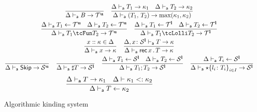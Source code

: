 \begin{figure}[h!]
  \centering
  \hfill{}
  \begin{gather*}
    \frac{}{\algkindout{\tcBase}{\kindt^\Un}}
    \quad 
    \frac{
      \algkindout{T_1}{\kind_1}
      \quad
      \algkindout{T_2}{\kind_2}
    }{
      \algkindout{\tPair{T_1}{T_2}}{\max(\kind_1, \kind_2)}
    }
    \\
    \frac{
      \algkindin{T_1}{\kindt^\Un}
      \quad
      \algkindin{T_2}{\kindt^\Un}
    }{
      \algkindout{\tUnFun{T_1}{T_2}}{\kindt^\Un}
      }
    \quad
    \frac{
      \algkindin{T_1}{\kindt^\Lin}
      \quad
      \algkindin{T_2}{\kindt^\Lin}
    }{
      \algkindout{\tLinFun{T_1}{T_2}}{\kindt^\Lin}
    }
    \\
    \frac{x :: \kind \in \kindEnv}{\algkindout x \kind}
   \quad
   \frac{
     \algkindout[\kindEnv, x\colon \kinds^\Lin] T \kind
   }{
     \algkindout{\tRec xT}{\kind}
   }
    \\
    \frac{}{\kindEnv \Alg \tskip \rightarrow \kinds^\Un}
    \quad 
    \frac{}{\algkindout{\tMsg T}{\kinds^\Lin}}
    \quad
    \frac{
      \algkindin{T_1}{\kinds^\Lin}
      \quad
      \algkindin{T_2}{\kinds^\Lin}
    }{
      \algkindout{\tSemi{T_1}{T_2}}{\kinds^\Lin}
    }
    \quad
    \frac{
      \algkindin{T_i}{\kinds^\Lin}
    }{
      \algkindout{\tChoice{\{l_i\colon T_i\}}_{i\in I}}{\kinds^\Lin}
    }
  \end{gather*}
  \hfill{}
  \begin{equation*}
    \frac{
      {\Delta} \vdash_{\textsf a} {T} \rightarrow{ \kappa_1}
      \quad
      {\Delta} \vdash {\kappa_1} <: {\kappa_2}
    }{
      {\Delta} \vdash_{\textsf a} {T} \leftarrow {\kappa_2}
    }
  \end{equation*}
  \caption{Algorithmic kinding system}
  \label{fig:kinding-system}
\end{figure}

